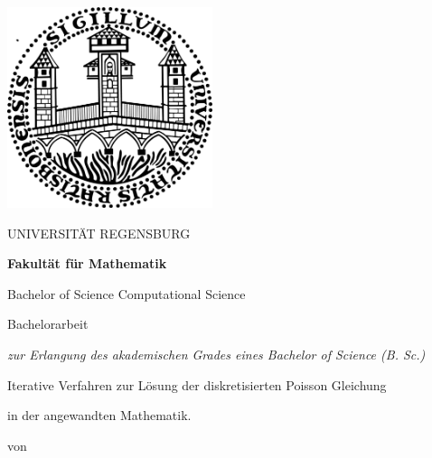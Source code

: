 


\pagestyle{empty}

\clearscrheadings\clearscrplain

\begin{center}
\includegraphics[width=6cm]{images/uniR.png}

\begin{huge}
UNIVERSITÄT REGENSBURG
\vspace{10mm}
\end{huge}

{\Large \textbf{Fakultät für Mathematik}}
\vspace{0mm}

{\Large Bachelor of Science Computational Science}

\vspace{10mm}
\begin{huge}
Bachelorarbeit
\end{huge}

\textit{zur Erlangung des akademischen Grades eines Bachelor of Science (B. Sc.)}

\vspace{10mm}

\begin{Large}
Iterative Verfahren zur Lösung der diskretisierten Poisson Gleichung
\end{Large}

\begin{large}
in der angewandten Mathematik.  
\end{large}

\vspace{5mm}
\begin{small}
von
\end{small}


\end{center}
